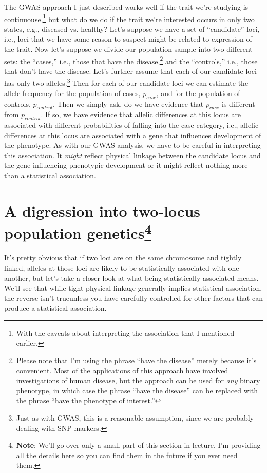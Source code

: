 The GWAS approach I just described works well if the trait we're
studying is continuouse,\footnote{With the caveats about interpreting
  the association that I mentioned earlier.} but what do we do if the
trait we're interested occurs in only two states, e.g., diseased
vs. healthy? Let's suppose we have a set of ``candidate'' loci, i.e.,
loci that we have some reason to suspect might be related to
expression of the trait. Now let's suppose we divide our population
sample into two different sets: the ``cases,'' i.e., those that have
the disease,\footnote{Please note that I'm using the phrase ``have the
  disease'' merely because it's convenient. Most of the applications
  of this approach have involved investigations of human disease, but
  the approach can be used for {\it any\/} binary phenotype, in which
  case the phrase ``have the disease'' can be replaced with the phrase
  ``have the phenotype of interest.''} and the ``controls,'' i.e.,
those that don't have the disease. Let's further assume that each of
our candidate loci has only two alleles.\footnote{Just as with GWAS,
  this is a reasonable assumption, since we are probably dealing with
  SNP markers.} Then for each of our candidate loci we can estimate
the allele frequency for the population of cases, $p_{case}$, and for
the population of controls, $p_{control}$. Then we simply ask, do we
have evidence that $p_{case}$ is different from $p_{control}$. If so,
we have evidence that allelic differences at this locus are associated
with different probabilities of falling into the case category, i.e.,
allelic differences at this locus are associated with a gene that
influences development of the phenotype. As with our GWAS analysis, we
have to be careful in interpreting this association. It {\it might\/}
reflect physical linkage between the candidate locus and the gene
influencing phenotypic development or it might reflect nothing more
than a statistical association.

\section*{A digression into two-locus population
  genetics\footnote{{\bf Note}: We'll go over only a small part of
  this section in lecture. I'm providing all the details here so you
  can find them in the future if you ever need them.}}

It's pretty obvious that if two loci are on the same chromosome and
tightly linked, alleles at those loci are likely to be statistically
associated with one another, but let's take a closer look at what
being statistically associated means. We'll see that while tight
physical linkage generally implies statistical association, the
reverse isn't true{\dash}unless you have carefully controlled for
other factors that can produce a statistical association.

